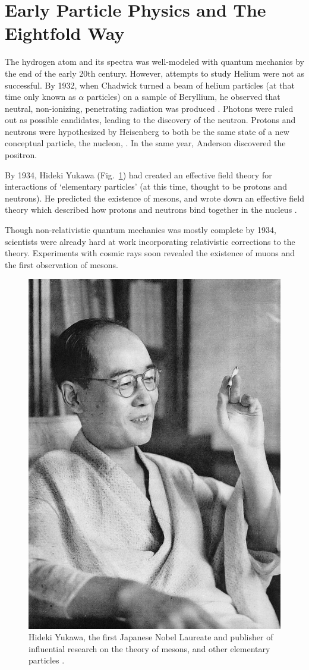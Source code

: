 \clearpage
\section{Early Particle Physics and The Eightfold Way}

The hydrogen atom and its spectra was well-modeled with quantum mechanics by the
end of the early 20th century. However, attempts to study Helium were not as
successful. By 1932, when Chadwick turned a beam of helium particles (at that
time only known as $\alpha$ particles) on a sample of Beryllium, he observed
that neutral, non-ionizing, penetrating radiation was produced
\cite{Krauss2015}.  Photons were ruled out as possible candidates, leading to
the discovery of the neutron. Protons and neutrons were hypothesized by
Heisenberg to both be the same state of a new conceptual particle, the nucleon,
\cite{Heisenberg1952}. In the same year, Anderson discovered the positron. 

By 1934, Hideki Yukawa (Fig.~\ref{fig:hidekiyukawa}) had created an effective
field theory for interactions of `elementary particles' (at this time, thought
to be protons and neutrons). He predicted the existence of mesons, and wrote
down an effective field theory which described how protons and neutrons bind
together in the nucleus \cite{Yukawa1935}. 

Though non-relativistic quantum mechanics was mostly complete by 1934,
scientists were already hard at work incorporating relativistic corrections to
the theory. Experiments with cosmic rays soon revealed the existence of muons
and the first observation of mesons.

\begin{figure}[ht]
	\begin{center}
		\includegraphics[width=0.5\linewidth]{./figures/hidekiyukawa.jpg}
		\caption{
			Hideki Yukawa, the first Japanese Nobel Laureate and publisher of
			influential research on the theory of mesons, and other elementary
			particles  \cite{YukawaPhoto1952}.
		}
		\label{fig:hidekiyukawa}
	\end{center}
\end{figure}

